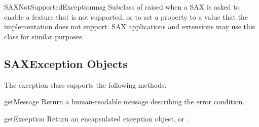 \begin{excclassdesc}{SAXNotSupportedException}{msg}
  Subclass of  raised when a SAX
   is asked to enable a feature that is not
  supported, or to set a property to a value that the implementation
  does not support.  SAX applications and extensions may use this
  class for similar purposes.
\end{excclassdesc}


\begin{seealso}
\end{seealso}


\subsection{SAXException Objects \label{sax-exception-objects}}

The  exception class supports the following
methods:

\begin{methoddesc}[SAXException]{getMessage}{}
  Return a human-readable message describing the error condition.
\end{methoddesc}

\begin{methoddesc}[SAXException]{getException}{}
  Return an encapsulated exception object, or .
\end{methoddesc}
